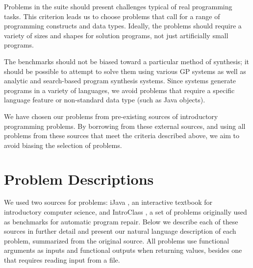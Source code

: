 \documentclass{sig-alternate}
\begin{document}
Problems in the suite should present challenges typical of real programming tasks. 
This criterion leads us to choose problems that call for a range of programming constructs and data types. Ideally, the problems should require a variety of sizes and shapes for solution programs, not just artificially small programs. 

The benchmarks should not be biased toward a particular method of synthesis; it should be possible to attempt to solve them using various GP systems as well as analytic and search-based program synthesis systems. Since systems generate programs in a variety of languages, we avoid problems that require a specific language feature or non-standard data type (such as Java objects).

We have chosen our problems from pre-existing sources of introductory programming problems. By borrowing from these external sources, and using all problems from these sources that meet the criteria described above, we aim to avoid biasing the selection of problems.



\section{Problem Descriptions} \label{descriptionsSection}

We used two sources for problems: iJava \cite{iJava}, an interactive textbook for introductory computer science, and IntroClass \cite{ManyBugsAndIntroClass, Brun13TRgptest}, a set of problems originally used as benchmarks for automatic program repair. Below we describe each of these sources in further detail and present our natural language description of each problem, summarized from the original source. All problems use functional arguments as inputs and functional outputs when returning values, besides one that requires reading input from a file.
\end{document}
